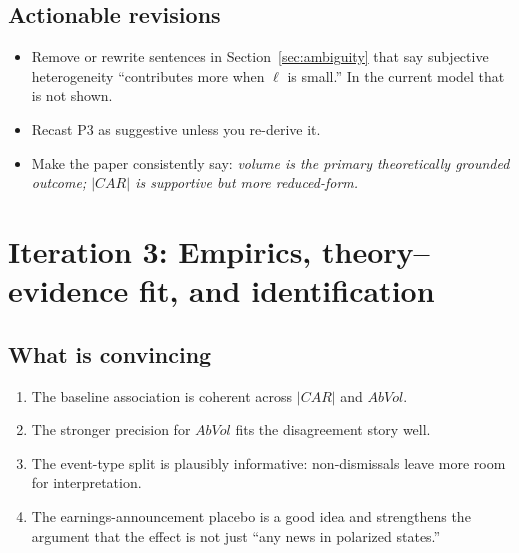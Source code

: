\documentclass[11pt]{article}
\begin{document}
\subsection*{Actionable revisions}
\begin{itemize}
    \item Remove or rewrite sentences in Section~\ref{sec:ambiguity} that say subjective heterogeneity ``contributes more when $\ell$ is small.'' In the current model that is not shown.
    \item Recast P3 as suggestive unless you re-derive it.
    \item Make the paper consistently say: \emph{volume is the primary theoretically grounded outcome; $|CAR|$ is supportive but more reduced-form.}
\end{itemize}

\section*{Iteration 3: Empirics, theory--evidence fit, and identification}

\subsection*{What is convincing}
\begin{enumerate}
    \item The baseline association is coherent across $|CAR|$ and $AbVol$.
    \item The stronger precision for $AbVol$ fits the disagreement story well.
    \item The event-type split is plausibly informative: non-dismissals leave more room for interpretation.
    \item The earnings-announcement placebo is a good idea and strengthens the argument that the effect is not just ``any news in polarized states.''
\end{enumerate}
\end{document}
